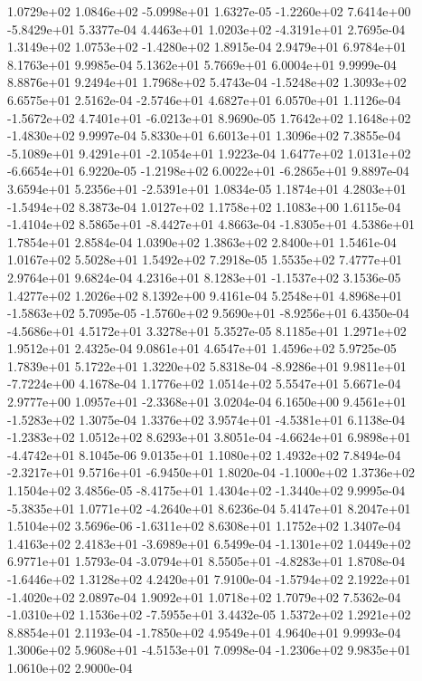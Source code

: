  1.0729e+02  1.0846e+02 -5.0998e+01  1.6327e-05
-1.2260e+02  7.6414e+00 -5.8429e+01  5.3377e-04
 4.4463e+01  1.0203e+02 -4.3191e+01  2.7695e-04
 1.3149e+02  1.0753e+02 -1.4280e+02  1.8915e-04
2.9479e+01 6.9784e+01 8.1763e+01  9.9985e-04
5.1362e+01 5.7669e+01 6.0004e+01  9.9999e-04
8.8876e+01 9.2494e+01 1.7968e+02  5.4743e-04
-1.5248e+02  1.3093e+02  6.6575e+01  2.5162e-04
-2.5746e+01  4.6827e+01  6.0570e+01  1.1126e-04
-1.5672e+02  4.7401e+01 -6.0213e+01  8.9690e-05
 1.7642e+02  1.1648e+02 -1.4830e+02  9.9997e-04
5.8330e+01 6.6013e+01 1.3096e+02  7.3855e-04
-5.1089e+01  9.4291e+01 -2.1054e+01  1.9223e-04
 1.6477e+02  1.0131e+02 -6.6654e+01  6.9220e-05
-1.2198e+02  6.0022e+01 -6.2865e+01  9.8897e-04
 3.6594e+01  5.2356e+01 -2.5391e+01  1.0834e-05
 1.1874e+01  4.2803e+01 -1.5494e+02  8.3873e-04
1.0127e+02 1.1758e+02 1.1083e+00  1.6115e-04
-1.4104e+02  8.5865e+01 -8.4427e+01  4.8663e-04
-1.8305e+01  4.5386e+01  1.7854e+01  2.8584e-04
1.0390e+02 1.3863e+02 2.8400e+01  1.5461e-04
1.0167e+02 5.5028e+01 1.5492e+02  7.2918e-05
1.5535e+02 7.4777e+01 2.9764e+01  9.6824e-04
 4.2316e+01  8.1283e+01 -1.1537e+02  3.1536e-05
1.4277e+02 1.2026e+02 8.1392e+00  9.4161e-04
 5.2548e+01  4.8968e+01 -1.5863e+02  5.7095e-05
-1.5760e+02  9.5690e+01 -8.9256e+01  6.4350e-04
-4.5686e+01  4.5172e+01  3.3278e+01  5.3527e-05
8.1185e+01 1.2971e+02 1.9512e+01  2.4325e-04
9.0861e+01 4.6547e+01 1.4596e+02  5.9725e-05
1.7839e+01 5.1722e+01 1.3220e+02  5.8318e-04
-8.9286e+01  9.9811e+01 -7.7224e+00  4.1678e-04
1.1776e+02 1.0514e+02 5.5547e+01  5.6671e-04
 2.9777e+00  1.0957e+01 -2.3368e+01  3.0204e-04
 6.1650e+00  9.4561e+01 -1.5283e+02  1.3075e-04
 1.3376e+02  3.9574e+01 -4.5381e+01  6.1138e-04
-1.2383e+02  1.0512e+02  8.6293e+01  3.8051e-04
-4.6624e+01  6.9898e+01 -4.4742e+01  8.1045e-06
9.0135e+01 1.1080e+02 1.4932e+02  7.8494e-04
-2.3217e+01  9.5716e+01 -6.9450e+01  1.8020e-04
-1.1000e+02  1.3736e+02  1.1504e+02  3.4856e-05
-8.4175e+01  1.4304e+02 -1.3440e+02  9.9995e-04
-5.3835e+01  1.0771e+02 -4.2640e+01  8.6236e-04
5.4147e+01 8.2047e+01 1.5104e+02  3.5696e-06
-1.6311e+02  8.6308e+01  1.1752e+02  1.3407e-04
 1.4163e+02  2.4183e+01 -3.6989e+01  6.5499e-04
-1.1301e+02  1.0449e+02  6.9771e+01  1.5793e-04
-3.0794e+01  8.5505e+01 -4.8283e+01  1.8708e-04
-1.6446e+02  1.3128e+02  4.2420e+01  7.9100e-04
-1.5794e+02  2.1922e+01 -1.4020e+02  2.0897e-04
1.9092e+01 1.0718e+02 1.7079e+02  7.5362e-04
-1.0310e+02  1.1536e+02 -7.5955e+01  3.4432e-05
1.5372e+02 1.2921e+02 8.8854e+01  2.1193e-04
-1.7850e+02  4.9549e+01  4.9640e+01  9.9993e-04
 1.3006e+02  5.9608e+01 -4.5153e+01  7.0998e-04
-1.2306e+02  9.9835e+01  1.0610e+02  2.9000e-04

